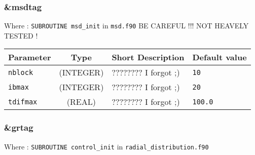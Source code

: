 \documentclass[a4paper,8pt]{article}
\begin{document}

\subsubsection{\&msdtag}

Where : \verb?SUBROUTINE msd_init? in \verb?msd.f90?
BE CAREFUL !!! NOT HEAVELY TESTED !
\newline

\begin{longtable}{l|c|m{8cm}|m{2cm}}
\hline
\hline
Parameter        &  Type              &          Short Description                                                          & Default value \\
\hline
\hline
\rule[-0.75cm]{0cm}{1.5cm}
\verb?nblock?    & (INTEGER)          & ???????? I forgot ;)                                                                & \verb?10? \\
\hline
\rule[-0.75cm]{0cm}{1.5cm}
\verb?ibmax?     &  (INTEGER)         & ???????? I forgot ;)                                                                & \verb?20? \\
\hline
\rule[-0.75cm]{0cm}{1.5cm}
\verb?tdifmax?   & (REAL)             & ???????? I forgot ;)                                                                & \verb?100.0? \\
\hline
\hline
\end{longtable}


\subsubsection{\&grtag}

Where : \verb?SUBROUTINE control_init? in \verb?radial_distribution.f90?
\newline
\end{document}
